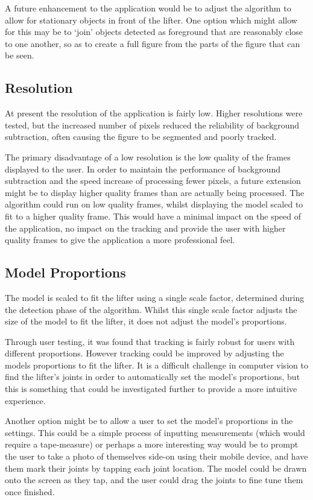 A future enhancement to the application would be to adjust the algorithm to allow for stationary objects in front of the lifter. One option which might allow for this may be to `join' objects detected as foreground that are reasonably close to one another, so as to create a full figure from the parts of the figure that can be seen.

\subsection{Resolution}

At present the resolution of the application is fairly low. Higher resolutions were tested, but the increased number of pixels reduced the reliability of background subtraction, often causing the figure to be segmented and poorly tracked.

The primary disadvantage of a low resolution is the low quality of the frames displayed to the user. In order to maintain the performance of background subtraction and the speed increase of processing fewer pixels, a future extension might be to display higher quality frames than are actually being processed. The algorithm could run on low quality frames, whilst displaying the model scaled to fit to a higher quality frame. This would have a minimal impact on the speed of the application, no impact on the tracking and provide the user with higher quality frames to give the application a more professional feel.

\subsection{Model Proportions}

The model is scaled to fit the lifter using a single scale factor, determined during the detection phase of the algorithm. Whilst this single scale factor adjusts the size of the model to fit the lifter, it does not adjust the model's proportions.

Through user testing, it was found that tracking is fairly robust for users with different proportions. However tracking could be improved by adjusting the models proportions to fit the lifter. It is a difficult challenge in computer vision to find the lifter's joints in order to automatically set the model's proportions, but this is something that could be investigated further to provide a more intuitive experience.

Another option might be to allow a user to set the model's proportions in the settings. This could be a simple process of inputting measurements (which would require a tape-measure) or perhaps a more interesting way would be to prompt the user to take a photo of themselves side-on using their mobile device, and have them mark their joints by tapping each joint location. The model could be drawn onto the screen as they tap, and the user could drag the joints to fine tune them once finished.

